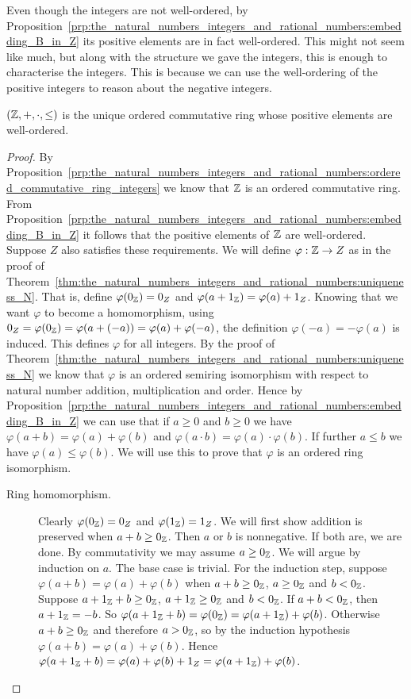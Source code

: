 \documentclass[../main.tex]{subfiles}
\begin{document}
Even though the integers are not well-ordered, by Proposition~\ref{prp:the_natural_numbers_integers_and_rational_numbers:embedding_B_in_Z} its positive elements are in fact well-ordered. This might not seem like much, but along with the structure we gave the integers, this is enough to characterise the integers. This is because we can use the well-ordering of the positive integers to reason about the negative integers.
\begin{theorem}\label{thm:the_natural_numbers_integers_and_rational_numbers:uniqueness_Z}
    $(\mathbb{Z},+,\cdot,\leq)$ is the unique ordered commutative ring whose positive elements are well-ordered.
\end{theorem}
\begin{proof}
    By Proposition~\ref{prp:the_natural_numbers_integers_and_rational_numbers:ordered_commutative_ring_integers} we know that $\mathbb{Z}$ is an ordered commutative ring. From Proposition~\ref{prp:the_natural_numbers_integers_and_rational_numbers:embedding_B_in_Z} it follows that the positive elements of $\mathbb{Z}$ are well-ordered. Suppose $Z$ also satisfies these requirements. We will define $\varphi:\mathbb{Z}\to Z$ as in the proof of Theorem~\ref{thm:the_natural_numbers_integers_and_rational_numbers:uniqueness_N}. That is, define $\varphi(0_{\mathbb{Z}})=0_Z$ and $\varphi(a+1_{\mathbb{Z}})=\varphi(a)+1_Z$. Knowing that we want $\varphi$ to become a homomorphism, using $0_Z=\varphi(0_{\mathbb{Z}})=\varphi(a+(-a))=\varphi(a)+\varphi(-a)$, the definition $\varphi(-a)=-\varphi(a)$ is induced. This defines $\varphi$ for all integers. By the proof of Theorem~\ref{thm:the_natural_numbers_integers_and_rational_numbers:uniqueness_N} we know that $\varphi$ is an ordered semiring isomorphism with respect to natural number addition, multiplication and order. Hence by Proposition~\ref{prp:the_natural_numbers_integers_and_rational_numbers:embedding_B_in_Z} we can use that if $a\geq0$ and $b\geq0$ we have $\varphi(a+b)=\varphi(a)+\varphi(b)$ and $\varphi(a\cdot b)=\varphi(a)\cdot\varphi(b)$. If further $a\leq b$ we have $\varphi(a)\leq\varphi(b)$. We will use this to prove that $\varphi$ is an ordered ring isomorphism.
    \begin{description}
        \item[Ring homomorphism.] Clearly $\varphi(0_{\mathbb{Z}})=0_Z$ and $\varphi(1_{\mathbb{Z}})=1_Z$. We will first show addition is preserved when $a+b\geq0_{\mathbb{Z}}$. Then $a$ or $b$ is nonnegative. If both are, we are done. By commutativity we may assume $a\geq0_{\mathbb{Z}}$. We will argue by induction on $a$. The base case is trivial. For the induction step, suppose $\varphi(a+b)=\varphi(a)+\varphi(b)$ when $a+b\geq0_{\mathbb{Z}}$, $a\geq0_{\mathbb{Z}}$ and $b<0_{\mathbb{Z}}$. Suppose $a+1_{\mathbb{Z}}+b\geq0_{\mathbb{Z}}$, $a+1_{\mathbb{Z}}\geq0_{\mathbb{Z}}$ and $b<0_{\mathbb{Z}}$. If $a+b<0_{\mathbb{Z}}$, then $a+1_{\mathbb{Z}}=-b$. So $\varphi(a+1_{\mathbb{Z}}+b)=\varphi(0_{\mathbb{Z}})=\varphi(a+1_{\mathbb{Z}})+\varphi(b)$. Otherwise $a+b\geq0_{\mathbb{Z}}$ and therefore $a>0_{\mathbb{Z}}$, so by the induction hypothesis $\varphi(a+b)=\varphi(a)+\varphi(b)$. Hence $\varphi(a+1_{\mathbb{Z}}+b)=\varphi(a)+\varphi(b)+1_Z=\varphi(a+1_{\mathbb{Z}})+\varphi(b)$.


\end{description}
\end{proof}
\end{document}
